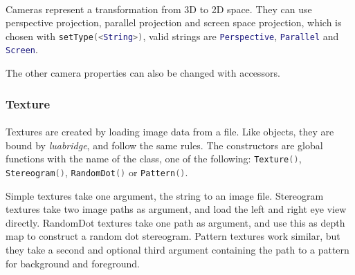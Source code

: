 \paragraph{}
Cameras represent a transformation from 3D to 2D space.
They can use perspective projection, parallel projection and screen space projection, which is chosen with \lstinline[language=lua]{setType(<String>)}, valid strings are \lstinline[language=lua]{Perspective}, \lstinline[language=lua]{Parallel} and \lstinline[language=lua]{Screen}.

The other camera properties can also be changed with accessors.

\subsubsection{Texture}
\paragraph{}
Textures are created by loading image data from a file.
Like objects, they are bound by \textit{luabridge}, and follow the same rules.
The constructors are global functions with the name of the class, one of the following:
\lstinline[language=lua]{Texture()}, \lstinline[language=lua]{Stereogram()}, \lstinline[language=lua]{RandomDot()} or \lstinline[language=lua]{Pattern()}.

Simple textures take one argument, the string to an image file.
Stereogram textures take two image paths as argument, and load the left and right eye view directly.
RandomDot textures take one path as argument, and use this as depth map to construct a random dot stereogram.
Pattern textures work similar, but they take a second and optional third argument containing the path to a pattern for background and foreground.

